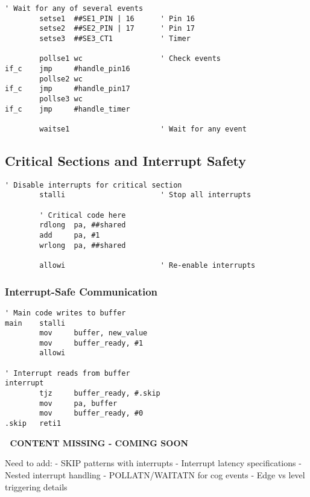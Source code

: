 \documentclass[11pt]{book}
\begin{document}
\begin{lstlisting}
' Wait for any of several events
        setse1  ##SE1_PIN | 16      ' Pin 16
        setse2  ##SE2_PIN | 17      ' Pin 17
        setse3  ##SE3_CT1           ' Timer
        
        pollse1 wc                  ' Check events
if_c    jmp     #handle_pin16
        pollse2 wc
if_c    jmp     #handle_pin17
        pollse3 wc
if_c    jmp     #handle_timer
        
        waitse1                     ' Wait for any event
\end{lstlisting}

\hypertarget{critical-sections-and-interrupt-safety}{%
\subsection{Critical Sections and Interrupt
Safety}\label{critical-sections-and-interrupt-safety}}

\begin{lstlisting}
' Disable interrupts for critical section
        stalli                      ' Stop all interrupts
        
        ' Critical code here
        rdlong  pa, ##shared
        add     pa, #1
        wrlong  pa, ##shared
        
        allowi                      ' Re-enable interrupts
\end{lstlisting}

\hypertarget{interrupt-safe-communication}{%
\subsubsection{Interrupt-Safe
Communication}\label{interrupt-safe-communication}}

\begin{lstlisting}
' Main code writes to buffer
main    stalli
        mov     buffer, new_value
        mov     buffer_ready, #1
        allowi
        
' Interrupt reads from buffer
interrupt
        tjz     buffer_ready, #.skip
        mov     pa, buffer
        mov     buffer_ready, #0
.skip   reti1
\end{lstlisting}

\begin{missing}
🚧 \textbf{CONTENT MISSING - COMING SOON}

Need to add:
- SKIP patterns with interrupts
- Interrupt latency specifications
- Nested interrupt handling
- POLLATN/WAITATN for cog events
- Edge vs level triggering details
\end{missing}
\end{document}
